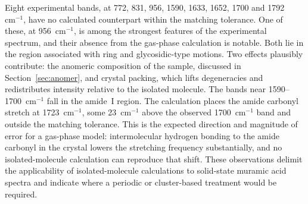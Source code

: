 \documentclass[preprint,12pt]{elsarticle}
\newcommand{\wn}{\ensuremath{\mathrm{cm}^{-1}}}
\begin{document}
Eight experimental bands, at 772, 831, 956, 1590, 1633, 1652, 1700 and
1792~\wn{}, have no calculated counterpart within the matching tolerance. One of these,
at 956~\wn{}, is among the strongest features of the experimental spectrum, and their absence from the gas-phase calculation is notable. Both lie in the region
associated with ring and glycosidic-type motions. Two effects plausibly
contribute: the anomeric composition of the sample, discussed in
Section~\ref{sec:anomer}, and crystal packing, which lifts degeneracies and
redistributes intensity relative to the isolated molecule. The bands near 1590--1700~\wn{} fall in the
amide~I region. The calculation places the amide carbonyl stretch at
1723~\wn{}, some 23~\wn{} above the observed 1700~\wn{} band and outside the
matching tolerance. This is the expected direction and magnitude of error for a
gas-phase model: intermolecular hydrogen bonding to the amide carbonyl in the
crystal lowers the stretching frequency substantially, and no isolated-molecule
calculation can reproduce that shift. These
observations delimit the applicability of isolated-molecule calculations to
solid-state muramic acid spectra and indicate where a periodic or
cluster-based treatment would be required.
\end{document}
